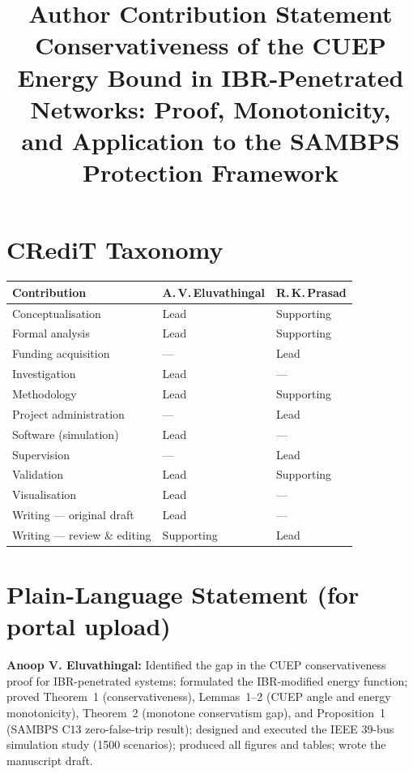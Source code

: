 \documentclass[11pt,a4paper]{article}
\title{\textbf{Author Contribution Statement}\\[4pt]
       \large Conservativeness of the CUEP Energy Bound in IBR-Penetrated
       Networks: Proof, Monotonicity, and Application to the SAMBPS
       Protection Framework}
\author{}
\date{}
\begin{document}
\maketitle\thispagestyle{empty}

\section*{CRediT Taxonomy}

\noindent
\begin{tabular}{@{}p{5.8cm} p{3.0cm} p{3.0cm}@{}}
\toprule
\textbf{Contribution} & \textbf{A.\,V.\,Eluvathingal} & \textbf{R.\,K.\,Prasad} \\
\midrule
Conceptualisation          & Lead   & Supporting \\
Formal analysis            & Lead   & Supporting \\
Funding acquisition        & ---    & Lead       \\
Investigation              & Lead   & ---        \\
Methodology                & Lead   & Supporting \\
Project administration     & ---    & Lead       \\
Software (simulation)      & Lead   & ---        \\
Supervision                & ---    & Lead       \\
Validation                 & Lead   & Supporting \\
Visualisation              & Lead   & ---        \\
Writing --- original draft & Lead   & ---        \\
Writing --- review \& editing & Supporting & Lead \\
\bottomrule
\end{tabular}

\bigskip

\section*{Plain-Language Statement (for portal upload)}

\textbf{Anoop V. Eluvathingal:} Identified the gap in the CUEP
conservativeness proof for IBR-penetrated systems; formulated the
IBR-modified energy function; proved Theorem~1 (conservativeness),
Lemmas~1--2 (CUEP angle and energy monotonicity), Theorem~2 (monotone
conservatism gap), and Proposition~1 (SAMBPS C13 zero-false-trip result);
designed and executed the IEEE 39-bus simulation study (1500 scenarios);
produced all figures and tables; wrote the manuscript draft.
\end{document}
